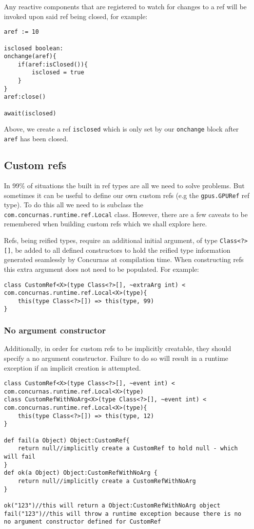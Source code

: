 \documentclass[conc-doc]{subfiles}
\begin{document}
Any reactive components that are registered to watch for changes to a ref will be invoked upon said ref being closed, for example:

\begin{lstlisting}
aref := 10

isclosed boolean:
onchange(aref){
	if(aref:isClosed()){
		isclosed = true
	}
}
aref:close()

await(isclosed)
\end{lstlisting}

Above, we create a ref \lstinline{isclosed} which is only set by our \lstinline{onchange} block after \lstinline{aref} has been closed.

\subsection{Custom refs}
In 99\% of situations the built in ref types are all we need to solve problems. But sometimes it can be useful to define our own custom refs (e.g the \lstinline{gpus.GPURef} ref type). To do this all we need to is subclass the \lstinline{com.concurnas.runtime.ref.Local} class. However, there are a few caveats to be remembered when building custom refs which we shall explore here. 

Refs, being reified types, require an additional initial argument, of type \lstinline{Class<?>[]}, be added to all defined constructors to hold the reified type information generated seamlessly by Concurnas at compilation time. When constructing refs this extra argument does not need to be populated. For example:

\begin{lstlisting}
class CustomRef<X>(type Class<?>[], ~extraArg int) < com.concurnas.runtime.ref.Local<X>(type){
	this(type Class<?>[]) => this(type, 99)
}
\end{lstlisting}


\subsubsection{No argument constructor}
Additionally, in order for custom refs to be implicitly creatable, they should specify a no argument constructor. Failure to do so will result in a runtime exception if an implicit creation is attempted.

\begin{lstlisting}
class CustomRef<X>(type Class<?>[], ~event int) < com.concurnas.runtime.ref.Local<X>(type)
class CustomRefWithNoArg<X>(type Class<?>[], ~event int) < com.concurnas.runtime.ref.Local<X>(type){
	this(type Class<?>[]) => this(type, 12)
}

def fail(a Object) Object:CustomRef{
	return null//implicitly create a CustomRef to hold null - which will fail
}
def ok(a Object) Object:CustomRefWithNoArg {
	return null//implicitly create a CustomRefWithNoArg
}

ok("123")//this will return a Object:CustomRefWithNoArg object
fail("123")//this will throw a runtime exception because there is no no argument constructor defined for CustomRef
\end{lstlisting}
\end{document}
